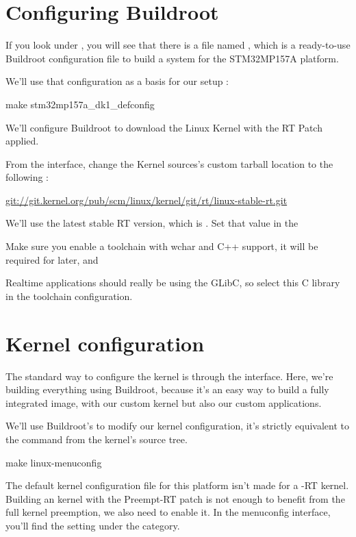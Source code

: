 \section{Configuring Buildroot}

If you look under , you will see that there is a file
named , which is a ready-to-use Buildroot
configuration file to build a system for the STM32MP157A platform.

We'll use that configuration as a basis for our setup :

\begin{bashinput}
make stm32mp157a_dk1_defconfig
\end{bashinput}

We'll configure Buildroot to download the Linux Kernel with the RT Patch applied.

From the  interface, change the Kernel sources's custom
tarball location to the following :

\url{git://git.kernel.org/pub/scm/linux/kernel/git/rt/linux-stable-rt.git}

We'll use the latest stable RT version, which is . Set that
value in the 

Make sure you enable a toolchain with wchar and C++ support, it will be required
for later, and 

Realtime applications should really be using the GLibC, so select this C library in the
toolchain configuration.

\section{Kernel configuration}
The standard way to configure the kernel is through the  interface. Here, we're building everything using
Buildroot, because it's an easy way to build a fully integrated image, with our custom kernel but also our custom applications.

We'll use Buildroot's  to modify our kernel configuration,
it's strictly equivalent to the  command from the kernel's source tree.

\begin{bashinput}
	make linux-menuconfig
\end{bashinput}

The default kernel configuration file for this platform isn't made for a -RT kernel. Building an kernel with the Preempt-RT patch is not enough to
benefit from the full kernel preemption, we also need to enable it. In the menuconfig interface, you'll find the  setting under the  category.

